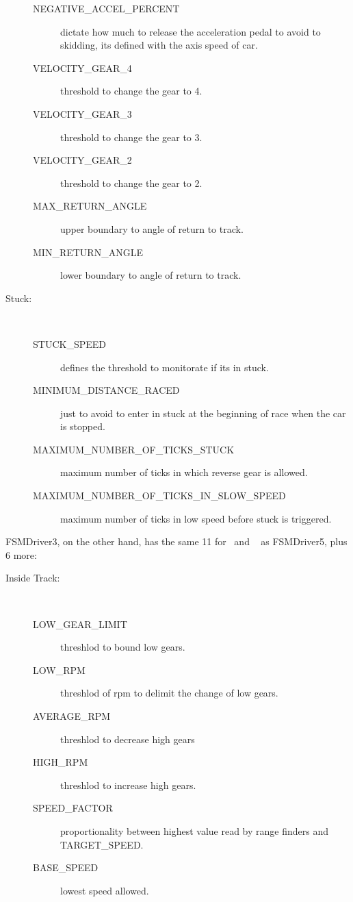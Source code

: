 \begin{description}
\begin{description}
		\item[NEGATIVE\_ACCEL\_PERCENT] dictate how much to release the acceleration pedal to avoid to skidding, its defined with the axis speed of car.
		\item[VELOCITY\_GEAR\_4] threshold to change the gear to 4.
		\item[VELOCITY\_GEAR\_3] threshold to change the gear to 3.
		\item[VELOCITY\_GEAR\_2] threshold to change the gear to 2.
		\item[MAX\_RETURN\_ANGLE] upper boundary to angle of return to track.
		\item[MIN\_RETURN\_ANGLE] lower boundary to angle of return to track.
	\end{description}
	\item[Stuck:] \ %
	\begin{description}
		\item[STUCK\_SPEED] defines the threshold to monitorate if its in stuck.
		\item[MINIMUM\_DISTANCE\_RACED] just to avoid to enter in stuck at the beginning of race when the car is stopped.
		\item[MAXIMUM\_NUMBER\_OF\_TICKS\_STUCK] maximum number of ticks in which reverse gear is allowed.
		\item[MAXIMUM\_NUMBER\_OF\_TICKS\_IN\_SLOW\_SPEED] maximum number of ticks in low speed before stuck is triggered.
	\end{description}
\end{description}

FSMDriver3, on the other hand, has the same 11 for \OT~and \St~ as FSMDriver5, plus 6 more:

\begin{description}
	\item[Inside Track:] \ %
	\begin{description}
		\item[LOW\_GEAR\_LIMIT] threshlod to bound low gears.
		\item[LOW\_RPM] threshlod of rpm to delimit the change of low gears.
		\item[AVERAGE\_RPM] threshlod to decrease high gears
		\item[HIGH\_RPM] threshlod to increase high gears.
		\item[SPEED\_FACTOR] proportionality between highest value read by range finders and TARGET\_SPEED.
		\item[BASE\_SPEED] lowest speed allowed.
	\end{description}
\end{description}

